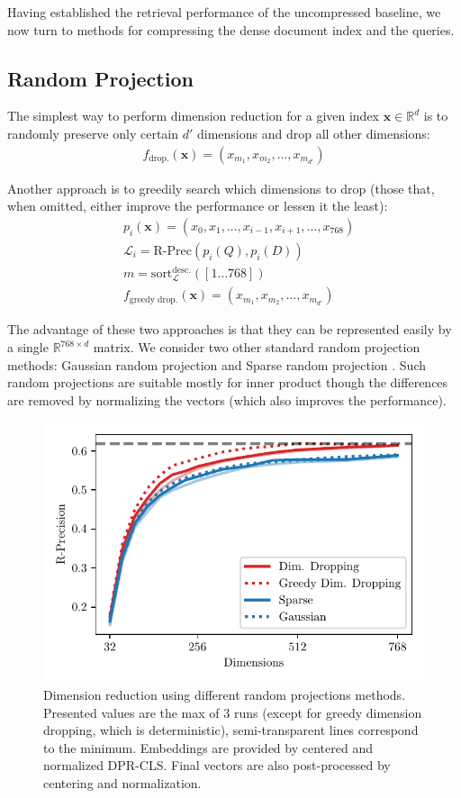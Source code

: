Having established the retrieval performance of the uncompressed baseline, we now turn to methods for compressing the dense document index and the queries.

\subsection{Random Projection}

The simplest way to perform dimension reduction for a given index $\bm{x} \in \mathbb{R}^d$ is to randomly preserve only certain $d'$ dimensions and drop all other dimensions:
\begin{gather*}
f_\text{drop.}(\bm{x}) = (x_{m_1}, x_{m_2}, \ldots, x_{m_{d'}})
\end{gather*}

Another approach is to greedily search which dimensions to drop (those that, when omitted, either improve the performance or lessen it the least):
\begin{align*}
& p_i(\bm{x}) = (x_0, x_1, {\ldots}, x_{i-1}, x_{i+1}, {\ldots}, x_{768}) \\
& \mathcal{L}_i = \text{R-Prec}(p_i(Q), p_i(D)) \\
& m = \text{sort}^\text{desc.}_\mathcal{L}([1 \ldots 768]) \\
& f_\text{greedy drop.}(\bm{x}) = (x_{m_1}, x_{m_2}, \ldots, x_{m_{d'}})
\end{align*}

The advantage of these two approaches is that they can be represented easily by a single $\mathbb{R}^{768\times d}$ matrix.
We consider two other standard random projection methods: Gaussian random projection and Sparse random projection \citep{fodor2002survey}.
Such random projections are suitable mostly for inner product \citep{kaski1998dimensionality} though the differences are removed by normalizing the vectors (which also improves the performance).

\begin{figure}[ht]
    \center
    \includegraphics[width=0.7\linewidth]{img/random_projection.pdf}
    
    \caption{Dimension reduction using different random projections methods. Presented values are the max of 3 runs (except for greedy dimension dropping, which is deterministic), semi-transparent lines correspond to the minimum. Embeddings are provided by centered and normalized DPR-CLS. Final vectors are also post-processed by centering and normalization.}
    \label{fig:random_projection}
\end{figure}

